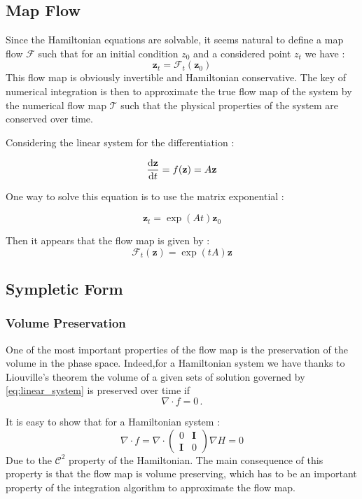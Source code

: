 \documentclass[ansiapaper]{report}
\begin{document}
\begin{multicols}{3}
  \subsection{Map Flow}

  Since the Hamiltonian equations are solvable, it seems natural to define a map flow $\mathcal{F}$ such that for an initial condition $z_0$ and a considered point $z_t$ we have :
  $$\textbf{z} _t = \mathcal{F}_t(\textbf{z}_0)$$
  This flow map is obviously invertible and Hamiltonian conservative. The key of numerical integration is then to approximate the true flow map of the system by the numerical flow map $\mathcal{T}$ such that the physical properties of the system are conserved over time.

  Considering the linear system for the differentiation :

  \begin{equation}
    \label{eq:linear_system}
    \dv{\textbf{z}}{t} = f(\textbf{z} ) = A\textbf{z}
  \end{equation}

  One way to solve this equation is to use the matrix exponential :

  $$\textbf{z}_t = \exp(At)\textbf{z}_0$$

  Then it appears that the flow map is given by :
  \begin{equation}
    \label{eq:flow_map}
    \mathcal{F}_t(\textbf{z} ) = \exp(tA)\textbf{z}
  \end{equation}

  \subsection{Sympletic Form}

  \subsubsection{Volume Preservation}
  One of the most important properties of the flow map is the preservation of the volume in the phase space. Indeed,for a Hamiltonian system we have thanks to Liouville's theorem the volume of a given sets of solution governed by \cref{eq:linear_system} is preserved over time if $$ \nabla \cdot f = 0 \, .$$

  It is easy to show that for a Hamiltonian system : $$\nabla \cdot f = \nabla \cdot \begin{pmatrix}
      0          & \textbf{I} \\
      \textbf{I} & 0
    \end{pmatrix} \nabla H = 0$$
  Due to the $\mathcal{C}^2$ property of the Hamiltonian. The main consequence of this property is that the flow map is volume preserving, which has to be an important property of the integration algorithm to approximate the flow map.


\end{multicols}
\end{document}
